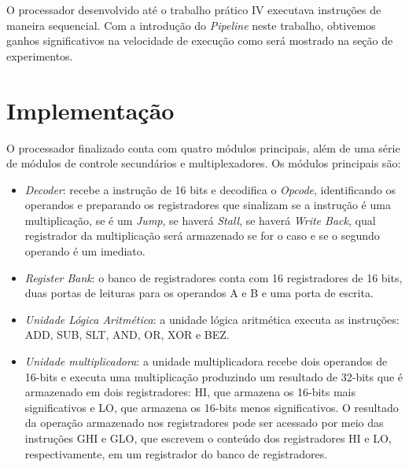 \documentclass[11pt,a4paper,titlepage]{article}
\begin{document}
O processador desenvolvido até o trabalho prático IV executava instruções de maneira
sequencial. Com a introdução do \textit{Pipeline} neste trabalho, obtivemos ganhos
significativos na velocidade de execução como será mostrado na seção de experimentos.

\section{Implementação}

O processador finalizado conta com quatro módulos principais, além de uma série de módulos
de controle secundários e multiplexadores. Os módulos principais são:

\begin{itemize}

\item \textit{Decoder}: recebe a instrução de 16 bits e decodifica o \textit{Opcode},
identificando os operandos e preparando os registradores que sinalizam se a instrução é uma 
multiplicação, se é um \textit{Jump}, se haverá \textit{Stall}, se haverá \textit{Write Back},
qual registrador da multiplicação será armazenado se for o caso e se o segundo operando é
um imediato.

\item \textit{Register Bank}: o banco de registradores conta com 16 registradores de 16 bits,
duas portas de leituras para os operandos A e B e uma porta de escrita.

\item \textit{Unidade Lógica Aritmética}: a unidade lógica aritmética executa as instruções: 
ADD, SUB, SLT, AND, OR, XOR e BEZ.

\item \textit{Unidade multiplicadora}: a unidade multiplicadora recebe dois operandos de 16-bits
e executa uma multiplicação produzindo um resultado de 32-bits que é armazenado em dois registradores:
HI, que armazena os 16-bits mais significativos e LO, que armazena os 16-bits menos significativos.
O resultado da operação armazenado nos registradores pode ser acessado por meio das instruções 
GHI e GLO, que escrevem o conteúdo dos registradores HI e LO, respectivamente, em um registrador
do banco de registradores.

\end{itemize}
\end{document}
